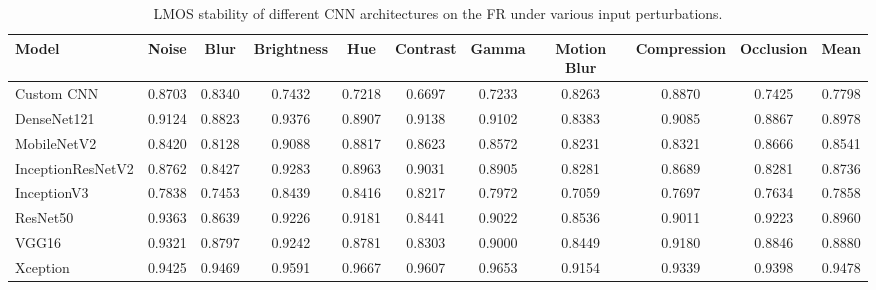 \documentclass[a4paper,fleqn]{cas-dc}
\begin{document}
\begin{table}[t]
\centering
\caption{LMOS stability of different CNN architectures on the FR under various input perturbations.}
\label{tab:lmos_stability_flowers_recognition}

\scriptsize
\setlength{\tabcolsep}{3pt}
\renewcommand{\arraystretch}{1.1}

\begin{tabular}{|l|ccccccccc|c|}
\hline
\textbf{Model} &
\textbf{Noise} &
\textbf{Blur} &
\textbf{Brightness} &
\textbf{Hue} &
\textbf{Contrast} &
\textbf{Gamma} &
\textbf{Motion Blur} &
\textbf{Compression} &
\textbf{Occlusion} &
\textbf{Mean} \\
\hline

Custom CNN
&0.8703&0.8340&0.7432&0.7218&0.6697&0.7233&0.8263&0.8870&0.7425&0.7798\\

DenseNet121
&0.9124&0.8823&0.9376&0.8907&0.9138&0.9102&0.8383&0.9085&0.8867&0.8978\\

MobileNetV2
&0.8420&0.8128&0.9088&0.8817&0.8623&0.8572&0.8231&0.8321&0.8666&0.8541\\

InceptionResNetV2
&0.8762&0.8427&0.9283&0.8963&0.9031&0.8905&0.8281&0.8689&0.8281&0.8736\\

InceptionV3
&0.7838&0.7453&0.8439&0.8416&0.8217&0.7972&0.7059&0.7697&0.7634&0.7858\\

ResNet50
&0.9363&0.8639&0.9226&0.9181&0.8441&0.9022&0.8536&0.9011&0.9223&0.8960\\

VGG16
&0.9321&0.8797&0.9242&0.8781&0.8303&0.9000&0.8449&0.9180&0.8846&0.8880\\

Xception
&0.9425&0.9469&0.9591&0.9667&0.9607&0.9653&0.9154&0.9339&0.9398&0.9478\\

\hline
\end{tabular}
\end{table}
\end{document}
